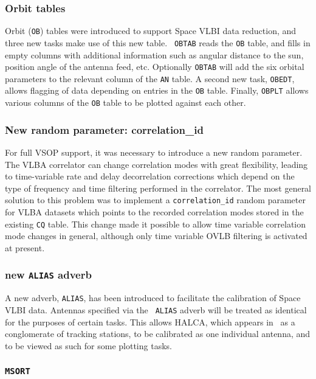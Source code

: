 \subsubsection{Orbit tables}

Orbit ({\tt OB}) tables were introduced to support Space VLBI data
reduction, and three new tasks make use of this new table.  {\tt
OBTAB} reads the {\tt OB} table, and fills in empty columns with
additional information such as angular distance to the sun, position
angle of the antenna feed, etc.  Optionally {\tt OBTAB} will add the
six orbital parameters to the relevant column of the {\tt AN} table.
A second new task, {\tt OBEDT}, allows flagging of data depending on
entries in the {\tt OB} table.  Finally, {\tt OBPLT} allows various
columns of the {\tt OB} table to be plotted against each other.

\subsubsection{New random parameter: correlation\_id}

For full VSOP support, it was necessary to introduce a new random
parameter.  The VLBA correlator can change correlation modes with
great flexibility, leading to time-variable rate and delay
decorrelation corrections which depend on the type of frequency and
time filtering performed in the correlator. The most general solution
to this problem was to implement a {\tt correlation\_id} random
parameter for VLBA datasets which points to the recorded correlation
modes stored in the existing {\tt CQ} table.  This change made it
possible to allow time variable correlation mode changes in general,
although only time variable OVLB filtering is activated at present.


\subsubsection{new {\tt ALIAS} adverb}

A new adverb, {\tt ALIAS}, has been introduced to facilitate the
calibration of Space VLBI data.  Antennas specified via the {\tt
ALIAS} adverb will be treated as identical for the purposes of certain
tasks.  This allows HALCA, which appears in \AIPS\ as a conglomerate
of tracking stations, to be calibrated as one individual antenna, and
to be viewed as such for some plotting tasks.


\subsubsection{\tt MSORT}

